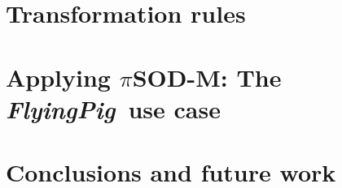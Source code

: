 \documentclass[preprint,12pt]{elsarticle}
\theoremstyle{plain}
\theoremstyle{plain}
\theoremstyle{plain}
\theoremstyle{plain}
\def\FlyingPig{\textsl{FlyingPig}}
\newcommand{\pisodm}[0]{$\pi$SOD-M\xspace}
\begin{document}
\section{Transformation rules}\label{sec:mmrules}


\section{Applying \pisodm: The \FlyingPig\ use case}
\label{sec:flyingPig}





\section{Conclusions and future work}\label{sec:conclusions}














\end{document}
